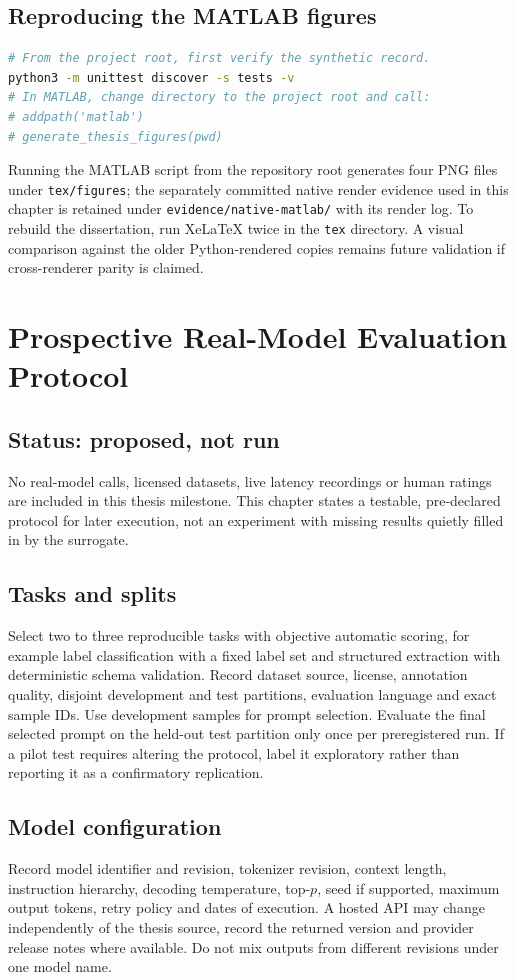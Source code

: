 \documentclass[12pt,a4paper,oneside]{report}
\begin{document}
\section{Reproducing the MATLAB figures}
\begin{lstlisting}[language=bash]
# From the project root, first verify the synthetic record.
python3 -m unittest discover -s tests -v
# In MATLAB, change directory to the project root and call:
# addpath('matlab')
# generate_thesis_figures(pwd)
\end{lstlisting}
Running the MATLAB script from the repository root generates four PNG files under \texttt{tex/figures}; the separately committed native render evidence used in this chapter is retained under \texttt{evidence/native-matlab/} with its render log. To rebuild the dissertation, run XeLaTeX twice in the \texttt{tex} directory. A visual comparison against the older Python-rendered copies remains future validation if cross-renderer parity is claimed.

\chapter{Prospective Real-Model Evaluation Protocol}
\section{Status: proposed, not run}
No real-model calls, licensed datasets, live latency recordings or human ratings are included in this thesis milestone. This chapter states a testable, pre-declared protocol for later execution, not an experiment with missing results quietly filled in by the surrogate.

\section{Tasks and splits}
Select two to three reproducible tasks with objective automatic scoring, for example label classification with a fixed label set and structured extraction with deterministic schema validation. Record dataset source, license, annotation quality, disjoint development and test partitions, evaluation language and exact sample IDs. Use development samples for prompt selection. Evaluate the final selected prompt on the held-out test partition only once per preregistered run. If a pilot test requires altering the protocol, label it exploratory rather than reporting it as a confirmatory replication.

\section{Model configuration}
Record model identifier and revision, tokenizer revision, context length, instruction hierarchy, decoding temperature, top-$p$, seed if supported, maximum output tokens, retry policy and dates of execution. A hosted API may change independently of the thesis source, record the returned version and provider release notes where available. Do not mix outputs from different revisions under one model name.
\end{document}

